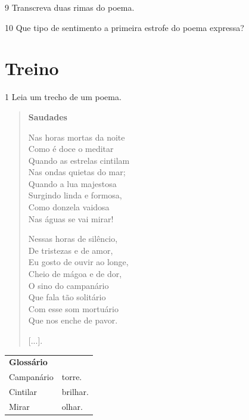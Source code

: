 \num{9} Transcreva duas rimas do poema.



\num{10} Que tipo de sentimento a primeira estrofe do poema expressa?


\pagebreak
\section*{Treino}

\num{1} Leia um trecho de um poema.

\begin{verse}
\textbf{Saudades}

Nas horas mortas da noite\\
Como é doce o meditar\\
Quando as estrelas cintilam\\
Nas ondas quietas do mar;\\
Quando a lua majestosa\\
Surgindo linda e formosa,\\
Como donzela vaidosa\\
Nas águas se vai mirar!

Nessas horas de silêncio,\\
De tristezas e de amor,\\
Eu gosto de ouvir ao longe,\\
Cheio de mágoa e de dor,\\
O sino do campanário\\
Que fala tão solitário\\
Com esse som mortuário\\
Que nos enche de pavor.

{[}...{]}.

\end{verse}

\begin{tabular}{ll}
\textbf{Glossário} & \mbox{}\\
Campanário & torre.\\
Cintilar & brilhar.\\
Mirar & olhar.
\end{tabular}

